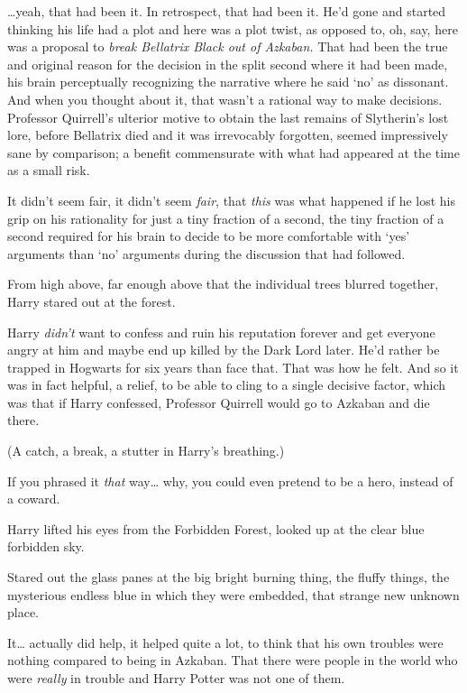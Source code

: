 {\ldots}yeah, that had been it. In retrospect, that had been it. He'd gone and 
started thinking his life had a plot and here was a plot twist, as opposed to, 
oh, say, here was a proposal to \emph{break Bellatrix Black out of Azkaban.} 
That had been the true and original reason for the decision in the split second 
where it had been made, his brain perceptually recognizing the narrative where 
he said `no' as dissonant. And when you thought about it, that wasn't a 
rational way to make decisions. Professor Quirrell's ulterior motive to obtain 
the last remains of Slytherin's lost lore, before Bellatrix died and it was 
irrevocably forgotten, seemed impressively sane by comparison; a benefit 
commensurate with what had appeared at the time as a small risk.

It didn't seem fair, it didn't seem \emph{fair}, that \emph{this} was what 
happened if he lost his grip on his rationality for just a tiny fraction of a 
second, the tiny fraction of a second required for his brain to decide to be 
more comfortable with `yes' arguments than `no' arguments during the discussion 
that had followed.

From high above, far enough above that the individual trees blurred together, 
Harry stared out at the forest.

Harry \emph{didn't} want to confess and ruin his reputation forever and get 
everyone angry at him and maybe end up killed by the Dark Lord later. He'd 
rather be trapped in Hogwarts for six years than face that. That was how he 
felt. And so it was in fact helpful, a relief, to be able to cling to a single 
decisive factor, which was that if Harry confessed, Professor Quirrell would go 
to Azkaban and die there.

(A catch, a break, a stutter in Harry's breathing.)

If you phrased it \emph{that} way{\ldots} why, you could even pretend to be a 
hero, instead of a coward.

Harry lifted his eyes from the Forbidden Forest, looked up at the clear blue 
forbidden sky.

Stared out the glass panes at the big bright burning thing, the fluffy things, 
the mysterious endless blue in which they were embedded, that strange new 
unknown place.

It{\ldots} actually did help, it helped quite a lot, to think that his own 
troubles were nothing compared to being in Azkaban. That there were people in 
the world who were \emph{really} in trouble and Harry Potter was not one of 
them.

